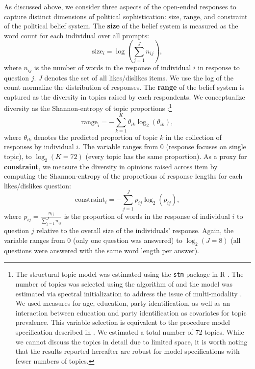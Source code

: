 \documentclass[12pt]{article}
\begin{document}
As discussed above, we consider three aspects of the open-ended responses to capture distinct dimensions of political sophistication: size, range, and constraint of the political belief system. The \textbf{size} of the belief system is measured as the word count for each individual over all prompts:
\begin{equation}
\text{size}_i = \log\left(\sum_{j=1}^J n_{ij}\right),
\end{equation}
where $n_{ij}$ is the number of words in the response of individual $i$ in response to question $j$. $J$ denotes the set of all likes/dislikes items. We use the log of the count normalize the distribution of responses. The \textbf{range} of the belief system is captured as the diversity in topics raised by each respondents. We conceptualize diversity as the Shannon-entropy of topic proportions \citep{shannon1948mathematical,munger2016elites}:\footnote{The structural topic model was estimated using the \texttt{stm} package in R \citep{roberts2014structural}. The number of topics was selected using the algorithm of \citet{lee2014low} and the model was estimated via spectral initialization to address the issue of multi-modality \citep[see][for details]{roberts2014stm}. We used measures for age, education, party identification, as well as an interaction between education and party identification as covariates for topic prevalence. This variable selection is equivalent to the procedure model specification described in \citet{roberts2014structural}. We estimated a total number of 72 topics. While we cannot discuss the topics in detail due to limited space, it is worth noting that the results reported hereafter are robust for model specifications with fewer numbers of topics.}
\begin{equation}
\text{range}_i = −\sum_{k=1}^K \theta_{ik} \log_2(\theta_{ik}),
\end{equation}
where $\theta_{ik}$ denotes the predicted proportion of topic $k$ in the collection of responses by individual $i$. The variable ranges from 0 (response focuses on single topic), to $\log_2(K=72)$ (every topic has the same proportion). As a proxy for \textbf{constraint}, we measure the diversity in opinions raised across item by computing the Shannon-entropy of the proportions of response lengths for each likes/dislikes question:
\begin{equation}
\text{constraint}_i = −\sum_{j=1}^J p_{ij} \log_2(p_{ij}),
\end{equation}
where $p_{ij}=\tfrac{n_{ij}}{\sum_{j=1}^J n_{ij}}$ is the proportion of words in the response of individual $i$ to question $j$ relative to the overall size of the individuals' response. Again, the variable ranges from 0 (only one question was answered) to $\log_2(J=8)$ (all questions were answered with the same word length per answer).
\end{document}
